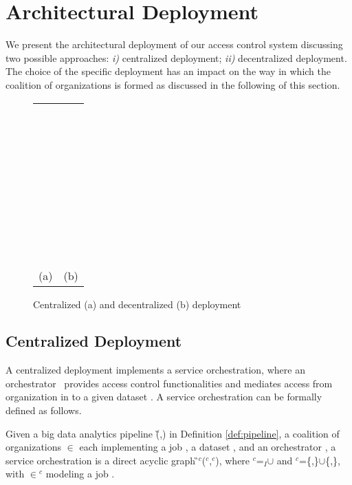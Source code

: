 \section{Architectural Deployment}\label{sec:architecture}
We present the architectural deployment of our access control system discussing two possible approaches: \emph{i)} centralized deployment; \emph{ii)} decentralized deployment. The choice of the specific deployment has an impact on the way in which the coalition \coalition{} of organizations  is formed as discussed in the following of this section.

\begin{figure*}[!t]
    \begin{tabular}{cc}
        \parbox[]{10cm}{~\\~\\~\\~\\~\\~\\~\\~\\~\\~\\}&\parbox[]{10cm}{~\\~\\~\\~\\~\\~\\~\\~\\~\\~\\}\\
        (a)&(b)\\
    \end{tabular}
    \caption{Centralized (a) and decentralized (b) deployment}
\end{figure*}

\subsection{Centralized Deployment}\label{sec:centralized}
A centralized deployment implements a service orchestration, where an orchestrator \orc\ provides access control functionalities and mediates access from organization  in \coalition{} to a given dataset \dataset{}. A service orchestration can be formally defined as follows.

\begin{definition}\label{def:orchestration}
    Given a big data analytics pipeline \G(\V,\E) in Definition \ref{def:pipeline}, a coalition \coalition{} of organizations $\in$\Org{} each implementing a job , a dataset \dataset{}, and an orchestrator \orc{}, a service orchestration is a direct acyclic graph \G$^c$(\V$^c$,\E$^c$), where \V$^c$=\V$_I$$\cup$\orc{} and \E$^c$=\{,\orc{}\}$\cup$\{\orc{},\}, with $\in$\V$^c$ modeling a job . 
\end{definition}

